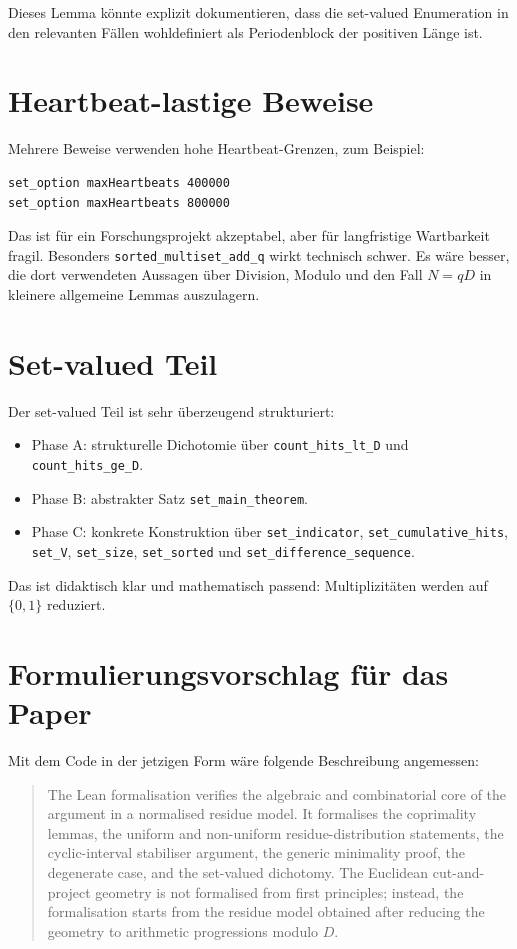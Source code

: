 \documentclass[11pt]{article}
\begin{document}
Dieses Lemma könnte explizit dokumentieren, dass die set-valued Enumeration in den relevanten Fällen wohldefiniert als Periodenblock der positiven Länge ist.

\section{Heartbeat-lastige Beweise}

Mehrere Beweise verwenden hohe Heartbeat-Grenzen, zum Beispiel:

\begin{lstlisting}
set_option maxHeartbeats 400000
set_option maxHeartbeats 800000
\end{lstlisting}

Das ist für ein Forschungsprojekt akzeptabel, aber für langfristige Wartbarkeit fragil. Besonders \texttt{sorted\_multiset\_add\_q} wirkt technisch schwer. Es wäre besser, die dort verwendeten Aussagen über Division, Modulo und den Fall \(N=qD\) in kleinere allgemeine Lemmas auszulagern.

\section{Set-valued Teil}

Der set-valued Teil ist sehr überzeugend strukturiert:

\begin{itemize}[leftmargin=2em]
    \item Phase A: strukturelle Dichotomie über \texttt{count\_hits\_lt\_D} und \texttt{count\_hits\_ge\_D}.
    \item Phase B: abstrakter Satz \texttt{set\_main\_theorem}.
    \item Phase C: konkrete Konstruktion über \texttt{set\_indicator}, \texttt{set\_cumulative\_hits}, \texttt{set\_V}, \texttt{set\_size}, \texttt{set\_sorted} und \texttt{set\_difference\_sequence}.
\end{itemize}

Das ist didaktisch klar und mathematisch passend: Multiplizitäten werden auf \(\{0,1\}\) reduziert.

\section{Formulierungsvorschlag für das Paper}

Mit dem Code in der jetzigen Form wäre folgende Beschreibung angemessen:

\begin{quote}
The Lean formalisation verifies the algebraic and combinatorial core of the argument in a normalised residue model. It formalises the coprimality lemmas, the uniform and non-uniform residue-distribution statements, the cyclic-interval stabiliser argument, the generic minimality proof, the degenerate case, and the set-valued dichotomy. The Euclidean cut-and-project geometry is not formalised from first principles; instead, the formalisation starts from the residue model obtained after reducing the geometry to arithmetic progressions modulo \(D\).
\end{quote}
\end{document}

